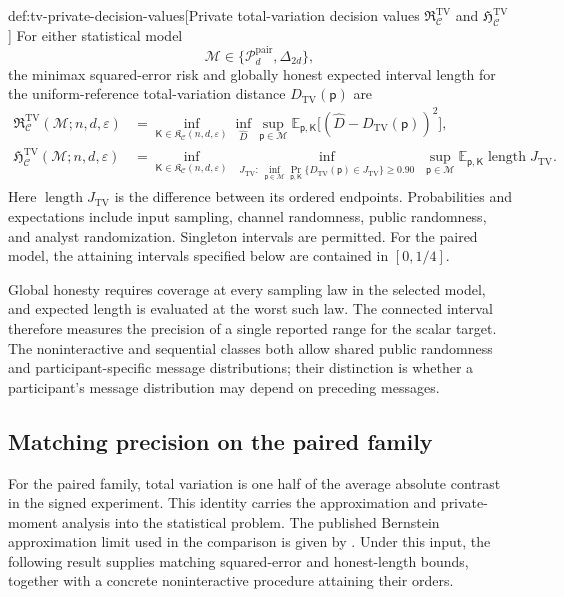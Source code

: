 \documentclass[11pt]{article}
\begin{document}
\begin{definitionv}{def:tv-private-decision-values}[Private total-variation decision values $\mathfrak R^{\mathrm{TV}}_{\mathcal C}$ and $\mathfrak H^{\mathrm{TV}}_{\mathcal C}$]
For either statistical model
\[
\mathcal M\in\{\mathcal P_d^{\mathrm{pair}},\Delta_{2d}\},
\]
the minimax squared-error risk and globally honest expected interval length for the uniform-reference total-variation distance \(D_{\mathrm{TV}}(\mathsf p)\) are
\[
\begin{aligned}
\mathfrak R^{\mathrm{TV}}_{\mathcal C}(\mathcal M;n,d,\varepsilon)
&=
\inf_{\mathsf K\in\mathfrak K_{\mathcal C}(n,d,\varepsilon)}
\inf_{\widehat D}
\sup_{\mathsf p\in\mathcal M}
\mathbb E_{\mathsf p,\mathsf K}
\bigl[(\widehat D-D_{\mathrm{TV}}(\mathsf p))^2\bigr],\\
\mathfrak H^{\mathrm{TV}}_{\mathcal C}(\mathcal M;n,d,\varepsilon)
&=
\inf_{\mathsf K\in\mathfrak K_{\mathcal C}(n,d,\varepsilon)}
\inf_{\substack{J_{\mathrm{TV}}:\,
\inf_{\mathsf p\in\mathcal M}
\Pr_{\mathsf p,\mathsf K}
\{D_{\mathrm{TV}}(\mathsf p)\in J_{\mathrm{TV}}\}\ge0.90}}
\sup_{\mathsf p\in\mathcal M}
\mathbb E_{\mathsf p,\mathsf K}
\operatorname{length}J_{\mathrm{TV}}.
\end{aligned}
\]
Here \(\operatorname{length}J_{\mathrm{TV}}\) is the difference between its ordered endpoints. Probabilities and expectations include input sampling, channel randomness, public randomness, and analyst randomization. Singleton intervals are permitted. For the paired model, the attaining intervals specified below are contained in \([0,1/4]\).
\end{definitionv}

Global honesty requires coverage at every sampling law in the selected model, and expected length is evaluated at the worst such law. The connected interval  therefore measures the precision of a single reported range for the scalar target. The noninteractive and sequential classes both allow shared public randomness and participant-specific message distributions; their distinction is whether a participant's message distribution may depend on preceding messages.

\subsection{Matching precision on the paired family}

For the paired family, total variation is one half of the average absolute contrast in the signed experiment. This identity carries the approximation and private-moment analysis into the statistical problem. The published Bernstein approximation limit used in the comparison is given by \citet[Section 3.1, p.~8]{CaiLow2011Nonsmooth}. Under this input, the following result supplies matching squared-error and honest-length bounds, together with a concrete noninteractive procedure attaining their orders.
\end{document}
